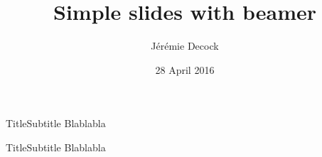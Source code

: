 \documentclass{beamer}
\title{Simple slides with beamer}
\author{Jérémie Decock}
\date{28 April 2016}
\begin{document}
\begin{frame}
    \titlepage
\end{frame}

\begin{frame}{Title}{Subtitle}
    Blablabla
\end{frame}

\begin{frame}{Title}{Subtitle}
    Blablabla
\end{frame}
\end{document}

